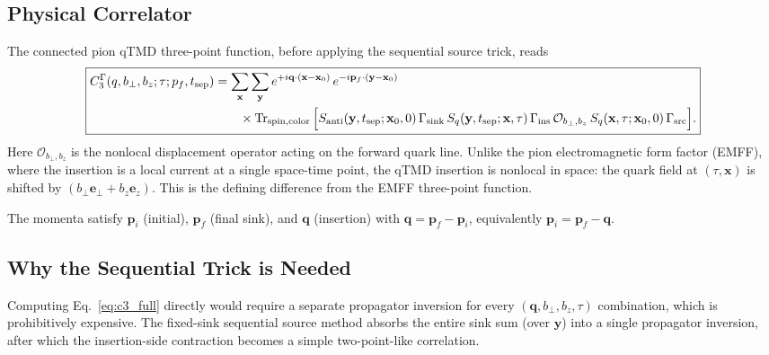 \documentclass[11pt,a4paper]{article}
\begin{document}
\subsection{Physical Correlator}

The connected pion qTMD three-point function, before applying the sequential
source trick, reads
\begin{equation}
  \boxed{
  \begin{aligned}
    C_3^{\Gamma}(q, b_\perp, b_z; \tau; p_f, t_{\rm sep})
    &=
    \sum_{\mathbf{x}}\sum_{\mathbf{y}}
    e^{+i\mathbf{q}\cdot(\mathbf{x}-\mathbf{x}_0)}\,
    e^{-i\mathbf{p}_f\cdot(\mathbf{y}-\mathbf{x}_0)} \\
    &\qquad\times
    \Tr_{\rm spin, color}\Big[
      S_{\rm anti}(\mathbf{y},t_{\rm sep}; \mathbf{x}_0,0)\,
      \Gamma_{\rm sink}\,
      S_q(\mathbf{y},t_{\rm sep}; \mathbf{x},\tau)\,
      \Gamma_{\rm ins}\,
      \mathcal{O}_{b_\perp,b_z}\,
      S_q(\mathbf{x},\tau; \mathbf{x}_0,0)\,
      \Gamma_{\rm src}
    \Big].
  \end{aligned}}
  \label{eq:c3_full}
\end{equation}
Here $\mathcal{O}_{b_\perp,b_z}$ is the nonlocal displacement operator acting on
the forward quark line.  Unlike the pion electromagnetic form factor (EMFF),
where the insertion is a local current at a single space-time point, the qTMD
insertion is nonlocal in space: the quark field at $(\tau,\mathbf{x})$ is
shifted by $(b_\perp\mathbf{e}_\perp + b_z\mathbf{e}_z)$.  This is the defining
difference from the EMFF three-point function.

The momenta satisfy $\mathbf{p}_i$ (initial), $\mathbf{p}_f$ (final sink), and
$\mathbf{q}$ (insertion) with
$\mathbf{q}=\mathbf{p}_f-\mathbf{p}_i$, equivalently
$\mathbf{p}_i=\mathbf{p}_f-\mathbf{q}$.

\subsection{Why the Sequential Trick is Needed}

Computing Eq.~\eqref{eq:c3_full} directly would require a separate propagator
inversion for every $(\mathbf{q}, b_\perp, b_z, \tau)$ combination, which is
prohibitively expensive.  The fixed-sink sequential source method absorbs the
entire sink sum (over $\mathbf{y}$) into a single propagator inversion, after
which the insertion-side contraction becomes a simple two-point-like
correlation.

\end{document}
